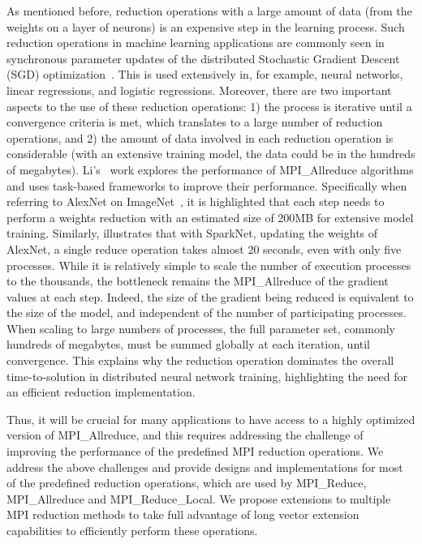 \documentclass[5p,times,twocolumn]{elsarticle}
\newcommand{\mpi}[0]{\textsc{MPI}\xspace}
\newcommand{\allreduce}[0]{MPI_Allreduce\xspace}
\begin{document}
As mentioned before, reduction operations with a large amount of
data (from the weights on a layer of neurons) is an expensive step in the
learning process.
Such reduction operations in machine learning applications
are commonly seen in synchronous parameter updates of the distributed Stochastic
Gradient Descent (SGD) optimization~\cite{sgd10}. This is used extensively
in, for example, neural networks, linear regressions, and logistic
regressions. Moreover, there are two important aspects to the use of these reduction operations: 1) the process is iterative until a convergence criteria is met, which translates to a large number of reduction
operations, and 2) the amount of data involved in each reduction operation is considerable (with an extensive training model, the data could be in the hundreds of megabytes).
%
Li's~\cite{inproceedings} work explores the performance of \allreduce algorithms
and uses task-based frameworks to improve their performance. Specifically when referring to AlexNet on ImageNet~\cite{NIPS20124824}, it is highlighted that
each step needs to perform a weights reduction with an estimated size
of 200MB for extensive model training.
%
Similarly, \cite{moritz2015sparknet}
illustrates that with SparkNet, updating the weights of AlexNet, a single reduce
operation takes almost 20 seconds, even with only five processes. While it is relatively simple to scale the number of execution processes to the thousands, the bottleneck remains the \allreduce of
the gradient values at each step. Indeed, the size of the gradient being reduced is equivalent
to the size of the model, and independent of the number of participating processes. When scaling to large numbers of processes, the full parameter set, commonly hundreds of
megabytes, must be summed globally at each iteration, until convergence. This explains why the reduction operation dominates the overall time-to-solution in distributed neural network
training, highlighting the need for an efficient reduction implementation.

Thus, it will be crucial for many applications to have access to a highly optimized version of MPI\_Allreduce, and this requires addressing the challenge of improving the performance of the predefined MPI reduction operations. We address the above challenges and provide designs and implementations for most of the predefined reduction operations, which are used by MPI\_Reduce, MPI\_Allreduce and MPI\_Reduce\_Local.
We propose extensions to multiple \mpi reduction methods to take full advantage of long vector extension capabilities to efficiently perform these operations.
\end{document}
